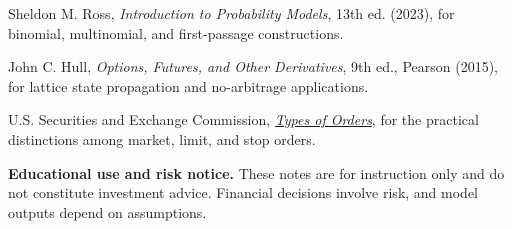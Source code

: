 \documentclass[11pt]{article}
\begin{document}
\begin{readinglist}
  \item Sheldon M. Ross, \emph{Introduction to Probability Models}, 13th ed. (2023), for binomial, multinomial, and first-passage constructions.
  \item John C. Hull, \emph{Options, Futures, and Other Derivatives}, 9th ed., Pearson (2015), for lattice state propagation and no-arbitrage applications.
  \item U.S. Securities and Exchange Commission, \href{https://www.investor.gov/introduction-investing/investing-basics/how-stock-markets-work/types-orders}{\emph{Types of Orders}}, for the practical distinctions among market, limit, and stop orders.
\end{readinglist}

\vfill
{\sffamily\footnotesize\color{vnmuted}\textbf{Educational use and risk notice.} These notes are for instruction only and do not constitute investment advice. Financial decisions involve risk, and model outputs depend on assumptions.}
\end{document}

